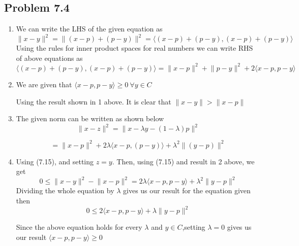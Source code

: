 \documentclass[letterpaper,12pt]{article}
\theoremstyle{definition}
\begin{document}
\subsection*{Problem 7.4}
\begin{enumerate}
    \item We can write the LHS of the given equation as
    \begin{equation*}
\lVert x-y \rVert^2 = \lVert (x-p)+(p-y) \rVert^2 = \langle (x-p)+(p-y), (x-p)+(p-y)\rangle
\end{equation*}
Using the rules for inner product spaces for real numbers we can write RHS of above equations as  
\begin{equation*}
 \langle (x-p)+(p-y), (x-p)+(p-y)\rangle =  \lVert x-p \rVert^2 +\lVert p-y \rVert^2 +2\langle x-p,p-y\rangle
\end{equation*}

    \item
    We are given that $\langle x-p,p-y\rangle \geq0 \ \forall y \in C$ 
    
    Using the result shown in 1 above. It is clear that $ \lVert x-y \rVert > \lVert x-p \rVert$
    \item
    The given norm can be written as shown below
    \begin{equation*}
  \lVert x-z \rVert^2= \lVert x-\lambda y -(1-\lambda)p \rVert^2
  \end{equation*}
  
   \begin{equation*}
   =
 \lVert x-p \rVert^2 +  2\lambda \langle x-p,(p-y)\rangle + \lambda^2 \lVert (y - p)\rVert^2 
\end{equation*}

    \item
Using (7.15), and setting $z=y$. Then, using (7.15) and result in 2 above, we get
\begin{equation*}
0 \leq \lVert x-y\rVert^2 - \lVert x-p\rVert^2 = 2\lambda \langle x-p, p-y\rangle + \lambda^2 \lVert y-p\rVert^2
\end{equation*}
Dividing the whole equation by $\lambda$ gives us our result for the equation given then 
\begin{equation*}
    0 \leq 2 \langle x-p,p-y \rangle + \lambda \lVert y-p \rVert^2 
\end{equation*}

Since the above equation holds for every $\lambda$ and $y \in C$,setting $\lambda=0$ gives us our result  $\langle x-p,p-y \rangle \geq 0 $

\end{enumerate}
\end{document}
